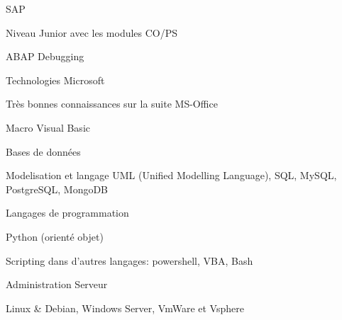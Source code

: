 

\begin{cventries}
	
	\zcventry
	{SAP} %
	{
		\begin{cvitems} %
			\item {Niveau Junior avec les modules CO/PS}
			\item {ABAP Debugging}
		\end{cvitems}
	}

	\zcventry
	{Technologies Microsoft} %
	{
		\begin{cvitems} %
			\item {Très bonnes connaissances sur la suite MS-Office}
			\item {Macro Visual Basic}
		\end{cvitems}
	}
	
	\zcventry
	{Bases de données} %
	{
		\begin{cvitems} %
			\item {Modelisation et langage UML (Unified Modelling Language), SQL, MySQL, PostgreSQL, MongoDB}
		\end{cvitems}
	}
	
	\zcventry
	{Langages de programmation} %
	{
		\begin{cvitems} %
			\item {Python (orienté objet)}
			\item {Scripting dans d'autres langages: powershell, VBA, Bash}
		\end{cvitems}
	}
	
	\zcventry
	{Administration Serveur} %
	{
		\begin{cvitems} %
			\item {Linux \& Debian, Windows Server, VmWare et Vsphere}
		\end{cvitems}
	}
	

\end{cventries}
